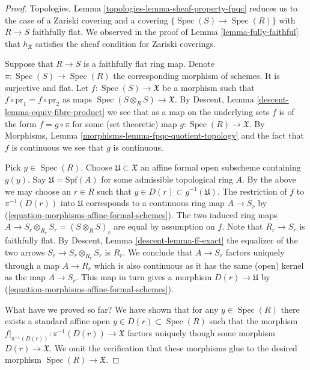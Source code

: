 \documentclass{stacks-project}
\theoremstyle{plain}
\theoremstyle{definition}
\theoremstyle{remark}
\numberwithin{equation}{subsection}
\def\Spec{\mathop{\mathrm{Spec}}}
\begin{document}
\begin{proof}
Topologies, Lemma \ref{topologies-lemma-sheaf-property-fpqc}
reduces us to the case of a Zariski covering and a covering
$\{\Spec(S) \to \Spec(R)\}$ with $R \to S$ faithfully flat.
We observed in the proof of Lemma \ref{lemma-fully-faithful} 
that $h_\mathfrak X$ satisfies the sheaf condition for Zariski coverings.

\medskip\noindent
Suppose that $R \to S$ is a faithfully flat ring map.
Denote $\pi : \Spec(S) \to \Spec(R)$ the
corresponding morphism of schemes. It is surjective and flat.
Let $f : \Spec(S) \to \mathfrak X$ be a morphism
such that $f \circ \text{pr}_1 = f \circ \text{pr}_2$
as maps $\Spec(S \otimes_R S) \to \mathfrak X$.
By Descent, Lemma \ref{descent-lemma-equiv-fibre-product}
we see that as a map on the underlying
sets $f$ is of the form $f = g \circ \pi$ for some
(set theoretic) map $g : \Spec(R) \to \mathfrak X$.
By Morphisms, Lemma \ref{morphisms-lemma-fpqc-quotient-topology}
and the fact that $f$ is continuous we see that $g$
is continuous.

\medskip\noindent
Pick $y \in \Spec(R)$. Choose $\mathfrak U \subset \mathfrak X$
an affine formal open subscheme containing $g(y)$.
Say $\mathfrak U = \text{Spf}(A)$ for some admissible topological
ring $A$. By the above we may choose an $r \in R$ such that
$y \in D(r) \subset g^{-1}(\mathfrak U)$.
The restriction of $f$ to $\pi^{-1}(D(r))$ into $\mathfrak U$
corresponds to a continuous ring map $A \to S_r$ by
(\ref{equation-morphisms-affine-formal-schemes}). The two induced ring maps
$A \to S_r \otimes_{R_r} S_r = (S \otimes_R S)_r$ are equal
by assumption on $f$.
Note that $R_r \to S_r$ is faithfully flat.
By Descent, Lemma \ref{descent-lemma-ff-exact} the equalizer of
the two arrows $S_r \to S_r \otimes_{R_r} S_r$ is $R_r$.
We conclude that $A \to S_r$ factors uniquely through a map $A \to R_r$
which is also continuous as it has the same (open) kernel as the
map $A \to S_r$. This map in turn gives a morphism $D(r) \to \mathfrak U$ by
(\ref{equation-morphisms-affine-formal-schemes}).

\medskip\noindent
What have we proved so far? We have shown that for any $y \in \Spec(R)$
there exists a standard affine open
$y \in D(r) \subset \Spec(R)$ such that the morphism
$f|_{\pi^{-1}(D(r))} : \pi^{-1}(D(r)) \to \mathfrak X$ factors uniquely
though some morphism $D(r) \to \mathfrak X$. We omit the
verification that these morphisms glue to the desired
morphism $\Spec(R) \to \mathfrak X$.
\end{proof}
\end{document}
